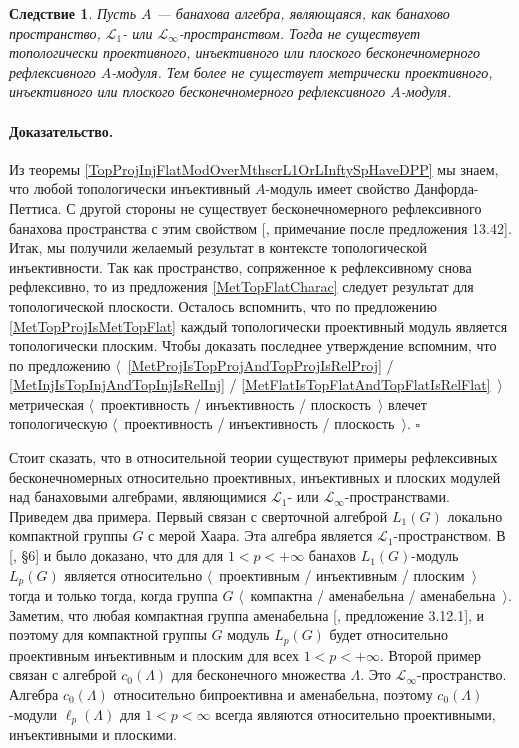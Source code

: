 \documentclass[12pt]{article}
\newtheorem{corollary}[theorem]{Следствие}
\renewenvironment{proof}{\paragraph{Доказательство.}}{\hfill$\square$\medskip}
\begin{document}
\begin{corollary}\label{NoInfDimRefMetTopProjInjFlatModOverMthscrL1OrLInfty} Пусть $A$ --- банахова алгебра, являющаяся, как банахово пространство, $\mathscr{L}_1$- или $\mathscr{L}_\infty$-пространством. Тогда не существует топологически проективного, инъективного или плоского бесконечномерного рефлексивного $A$-модуля. Тем более не существует метрически проективного, инъективного или плоского бесконечномерного рефлексивного $A$-модуля.
\end{corollary}
\begin{proof} Из теоремы \ref{TopProjInjFlatModOverMthscrL1OrLInftySpHaveDPP} мы знаем, что любой топологически инъективный $A$-модуль имеет свойство Данфорда-Петтиса. С другой стороны не существует бесконечномерного рефлексивного банахова пространства с этим свойством [\cite{FabHabBanSpTh}, примечание после предложения 13.42]. Итак, мы получили желаемый результат в контексте топологической инъективности. Так как пространство, сопряженное к рефлексивному снова рефлексивно, то из предложения \ref{MetTopFlatCharac} следует результат для топологической плоскости. Осталось вспомнить, что по предложению \ref{MetTopProjIsMetTopFlat} каждый топологически проективный модуль является топологически плоским. Чтобы доказать последнее утверждение вспомним, что по предложению $\langle$~\ref{MetProjIsTopProjAndTopProjIsRelProj} / \ref{MetInjIsTopInjAndTopInjIsRelInj} / \ref{MetFlatIsTopFlatAndTopFlatIsRelFlat}~$\rangle$ метрическая $\langle$~проективность / инъективность / плоскость~$\rangle$ влечет топологическую $\langle$~проективность / инъективность / плоскость~$\rangle$.
\end{proof}

Стоит сказать, что в относительной теории существуют примеры рефлексивных бесконечномерных относительно проективных, инъективных и плоских модулей над банаховыми алгебрами, являющимися $\mathscr{L}_1$- или $\mathscr{L}_\infty$-пространствами. Приведем два примера. Первый связан с сверточной алгеброй $L_1(G)$ локально компактной группы $G$ с мерой Хаара. Эта алгебра является $\mathscr{L}_1$-пространством. В [\cite{DalPolHomolPropGrAlg}, \S6] и \cite{RachInjModAndAmenGr} было доказано, что для для $1<p<+\infty$ банахов $L_1(G)$-модуль $L_p(G)$ является относительно $\langle$~проективным / инъективным / плоским~$\rangle$ тогда и только тогда, когда группа $G$  $\langle$~компактна / аменабельна / аменабельна~$\rangle$. Заметим, что любая компактная группа аменабельна [\cite{PierAmenLCA}, предложение 3.12.1], и поэтому для компактной группы $G$ модуль $L_p(G)$ будет относительно проективным инъективным и плоским для всех $1<p<+\infty$. Второй пример связан с алгеброй $c_0(\Lambda)$ для бесконечного множества $\Lambda$. Это $\mathscr{L}_\infty$-пространство. Алгебра $c_0(\Lambda)$ относительно бипроективна и аменабельна, поэтому $c_0(\Lambda)$-модули $\ell_p(\Lambda)$ для $1<p<\infty$ всегда являются относительно проективными, инъективными и плоскими. 



\end{document}
